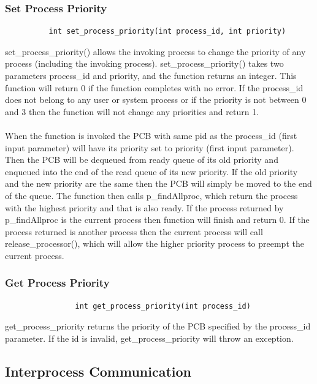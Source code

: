 \documentclass[12pt]{article}
\begin{document}
\subsubsection{Set Process Priority}
\begin{verbatim}
          int set_process_priority(int process_id, int priority)
\end{verbatim}
set\_process\_priority() allows the invoking process to change the priority of any process (including the invoking process). set\_process\_priority() takes two parameters process\_id and priority, and the function returns an integer. This function will return 0 if the function completes with no error. If the process\_id does not belong to any user or system process or if the priority is not between 0 and 3 then the function will not change any priorities and return 1.\\ \\
When the function is invoked the PCB with same pid as the process\_id (first input parameter) will have its priority set to priority (first input parameter). Then the PCB will be dequeued from ready queue of its old priority and enqueued into the end of the read queue of its new priority. If the old priority and the new priority are the same then the PCB will simply be moved to the end of the queue. The function then calls p\_findAllproc, which return the process with the highest priority and that is also ready. If the process returned by p\_findAllproc is the current process then function will finish and return 0. If the process returned is another process then the current process will call release\_processor(), which will allow the higher priority process to preempt the current process.
\subsubsection{Get Process Priority}
\begin{verbatim}
                int get_process_priority(int process_id)
\end{verbatim}
get\_process\_priority returns the priority of the PCB specified by the process\_id parameter. If the id is invalid, get\_process\_priority will throw an exception.
\subsection{Interprocess Communication}
\end{document}
